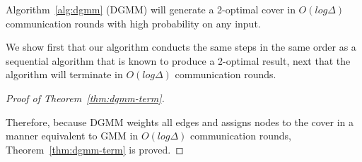\begin{thm}
  Algorithm~\ref{alg:dgmm} (DGMM) will generate a 2-optimal cover in $O(log \Delta)$ communication rounds with high probability on any input.
\label{thm:dgmm-term}
\end{thm}
\begin{smy}
We show first that our algorithm conducts the same steps in the same order as a sequential algorithm that is known to produce a 2-optimal result, next that the algorithm will terminate in $O(log \Delta)$ communication rounds.
\end{smy} 


\begin{proof}[Proof of Theorem~\ref{thm:dgmm-term}]
\label{prf:correct}




Therefore, because DGMM weights all edges and assigns nodes to the cover in a manner equivalent to GMM in $O(log \Delta)$ communication rounds, Theorem~\ref{thm:dgmm-term} is proved.
\end{proof}

